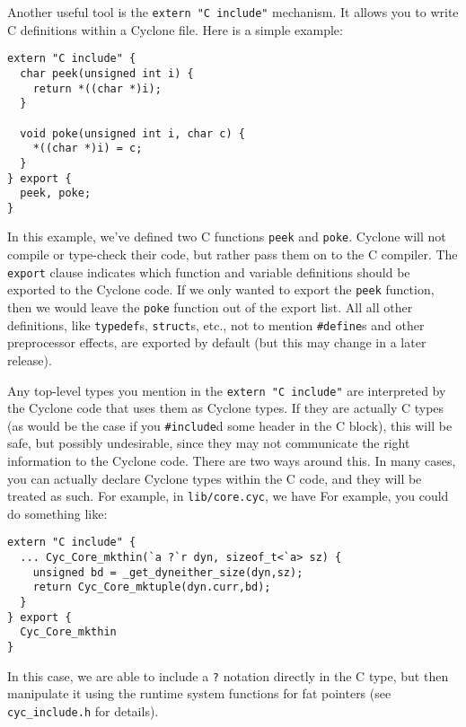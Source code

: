 Another useful tool is the \texttt{extern "C include"} mechanism.
It allows you to write C definitions within a Cyclone file.  Here
is a simple example:
\begin{verbatim}
extern "C include" {
  char peek(unsigned int i) {
    return *((char *)i);
  }

  void poke(unsigned int i, char c) {
    *((char *)i) = c;
  }
} export {
  peek, poke;
}
\end{verbatim}
In this example, we've defined two C functions \texttt{peek} and
\texttt{poke}.  Cyclone will not compile or type-check their code, but
rather pass them on to the C compiler.  The \texttt{export} clause
indicates which function and variable definitions should be exported
to the Cyclone code.  If we only wanted to export the \texttt{peek}
function, then we would leave the \texttt{poke} function out of the
export list.  All all other definitions, like \texttt{typedef}s,
\texttt{struct}s, etc., not to mention \texttt{\#define}s and other
preprocessor effects, are exported by default (but this may change in
a later release).

Any top-level types you mention in the \texttt{extern "C include"} are
interpreted by the Cyclone code that uses them as Cyclone types.  If
they are actually C types (as would be the case if you
\texttt{\#include}d some header in the C block), this will be safe, but
possibly undesirable, since they may not communicate the right
information  to the Cyclone code.  There are two ways around this.
In many cases, you can actually declare Cyclone types within the C
code, and they will be treated as such.  For example, in
\texttt{lib/core.cyc}, we have
For example, you could do something like:
\begin{verbatim}
extern "C include" {
  ... Cyc_Core_mkthin(`a ?`r dyn, sizeof_t<`a> sz) {
    unsigned bd = _get_dyneither_size(dyn,sz);
    return Cyc_Core_mktuple(dyn.curr,bd);
  } 
} export {
  Cyc_Core_mkthin
}
\end{verbatim}
In this case, we are able to include a \texttt{?} notation directly in
the C type, but then manipulate it using the runtime system functions
for fat pointers (see \texttt{cyc_include.h} for details).

